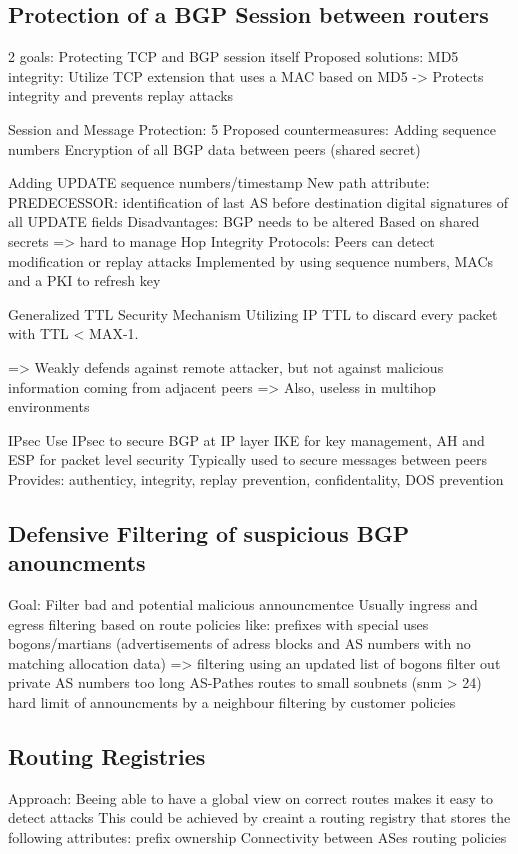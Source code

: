 \documentclass[12pt]{IEEEtran}
\begin{document}
	\subsection{Protection of a BGP Session between routers}
	2 goals: Protecting TCP and BGP session itself
		Proposed solutions:
			MD5 integrity: Utilize TCP extension that uses a MAC based on MD5
					-> Protects integrity and prevents replay attacks

			Session and Message Protection:
				5 Proposed countermeasures:
					Adding sequence numbers
					Encryption of all BGP data between peers (shared secret)
					
					Adding UPDATE sequence numbers/timestamp
					New path attribute: PREDECESSOR: identification of last AS before destination
					digital signatures of all UPDATE fields
				Disadvantages: BGP needs to be altered
					       Based on shared secrets => hard to manage
			Hop Integrity Protocols:
				Peers can detect modification or replay attacks	
				Implemented by using sequence numbers, MACs and a PKI to refresh key

			Generalized TTL Security Mechanism
				Utilizing IP TTL to discard every packet with TTL < MAX-1. 
				
				=> Weakly defends against remote attacker, but not against malicious information coming from adjacent peers
				=> Also, useless in multihop environments
				
			IPsec
				Use IPsec to secure BGP at IP layer 
				IKE for key management, AH and ESP for packet level security
				Typically used to secure messages between peers
				Provides: authenticy, integrity, replay prevention, confidentality, DOS prevention
			


       \subsection{Defensive Filtering of suspicious BGP anouncments}
	Goal: Filter bad and potential malicious announcmentce 
	Usually ingress and egress filtering based on route policies like:
			prefixes with special uses
			bogons/martians (advertisements of adress blocks and AS numbers with no matching allocation data)
				=> filtering using an updated list of bogons
			filter out private AS numbers
			too long AS-Pathes
			routes to small soubnets (snm > 24) 
			hard limit of announcments by a neighbour 
			filtering by customer policies
				

       \subsection{Routing Registries}
		Approach: Beeing able to have a global view on correct routes makes it easy to detect attacks
		This could be achieved by creaint a routing registry that stores the following attributes:
			prefix ownership
			Connectivity between ASes
			routing policies
			
\end{document}
